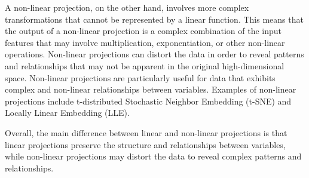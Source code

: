 A non-linear projection, on the other hand, involves more complex
transformations that cannot be represented by a linear function. This
means that the output of a non-linear projection is a complex combination
of the input features that may involve multiplication, exponentiation, or
other non-linear operations. Non-linear projections can distort the data
in order to reveal patterns and relationships that may not be apparent in
the original high-dimensional space. Non-linear projections are
particularly useful for data that exhibits complex and non-linear
relationships between variables. Examples of non-linear projections
include t-distributed Stochastic Neighbor Embedding (t-SNE) and Locally
Linear Embedding (LLE).

Overall, the main difference between linear and non-linear projections is
that linear projections preserve the structure and relationships between
variables, while non-linear projections may distort the data to reveal
complex patterns and relationships.

